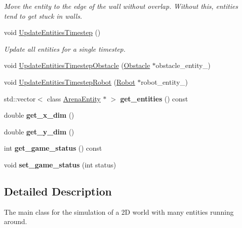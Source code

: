 \begin{DoxyCompactItemize}
\begin{DoxyCompactList}\small\item\em Move the entity to the edge of the wall without overlap. Without this, entities tend to get stuck in walls. \end{DoxyCompactList}\item 
void \hyperlink{classArena_a682ec81cb30e36e5bb801b3388bcb494}{Update\+Entities\+Timestep} ()
\begin{DoxyCompactList}\small\item\em Update all entities for a single timestep. \end{DoxyCompactList}\item 
void \hyperlink{classArena_a897f8f425ae505dbb5d9aaff59f72451}{Update\+Entities\+Timestep\+Obstacle} (\hyperlink{classObstacle}{Obstacle} $\ast$obstacle\+\_\+entity\+\_\+)
\item 
void \hyperlink{classArena_a694f8bbb2c7c235f83f33dbd4eac457f}{Update\+Entities\+Timestep\+Robot} (\hyperlink{classRobot}{Robot} $\ast$robot\+\_\+entity\+\_\+)
\item 
std\+::vector$<$ class \hyperlink{classArenaEntity}{Arena\+Entity} $\ast$ $>$ {\bfseries get\+\_\+entities} () const \hypertarget{classArena_aabb4ffe05aefc71ee10d47b191963fe5}{}\label{classArena_aabb4ffe05aefc71ee10d47b191963fe5}

\item 
double {\bfseries get\+\_\+x\+\_\+dim} ()\hypertarget{classArena_a5e3be20f2c67338a5a684b85a66f6b96}{}\label{classArena_a5e3be20f2c67338a5a684b85a66f6b96}

\item 
double {\bfseries get\+\_\+y\+\_\+dim} ()\hypertarget{classArena_a35737d65ff32f2bd5871f0bdfbc10a85}{}\label{classArena_a35737d65ff32f2bd5871f0bdfbc10a85}

\item 
int {\bfseries get\+\_\+game\+\_\+status} () const \hypertarget{classArena_a6d196837daa08a2618c3ff6e0a741b25}{}\label{classArena_a6d196837daa08a2618c3ff6e0a741b25}

\item 
void {\bfseries set\+\_\+game\+\_\+status} (int status)\hypertarget{classArena_ac8e8b3438db02aa5395f7fcb537ed952}{}\label{classArena_ac8e8b3438db02aa5395f7fcb537ed952}

\end{DoxyCompactItemize}


\subsection{Detailed Description}
The main class for the simulation of a 2D world with many entities running around. 

